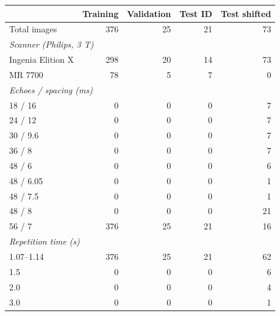 \begin{tabular}{lrrrr}
    \toprule
                                      & Training & Validation & Test ID & Test shifted \\
    \midrule
    Total images                      & 376      & 25         & 21      & 73           \\
    \midrule
    \multicolumn{5}{l}{\textit{Scanner (Philips, 3 T)}}                                \\
    Ingenia Elition X                 & 298      & 20         & 14      & 73           \\
    MR 7700                           & 78       & 5          & 7       & 0            \\
    \midrule
    \multicolumn{5}{l}{\textit{Echoes / spacing (ms)}}                                 \\
    18 / 16                           & 0        & 0          & 0       & 7            \\
    24 / 12                           & 0        & 0          & 0       & 7            \\
    30 / 9.6                          & 0        & 0          & 0       & 7            \\
    36 / 8                            & 0        & 0          & 0       & 7            \\
    48 / 6                            & 0        & 0          & 0       & 6            \\
    48 / 6.05                         & 0        & 0          & 0       & 1            \\
    48 / 7.5                          & 0        & 0          & 0       & 1            \\
    48 / 8                            & 0        & 0          & 0       & 21           \\
    56 / 7                            & 376      & 25         & 21      & 16           \\
    \midrule
    \multicolumn{5}{l}{\textit{Repetition time (s)}}                                   \\
    1.07--1.14                        & 376      & 25         & 21      & 62           \\
    1.5                               & 0        & 0          & 0       & 6            \\
    2.0                               & 0        & 0          & 0       & 4            \\
    3.0                               & 0        & 0          & 0       & 1            \\

\end{tabular}
